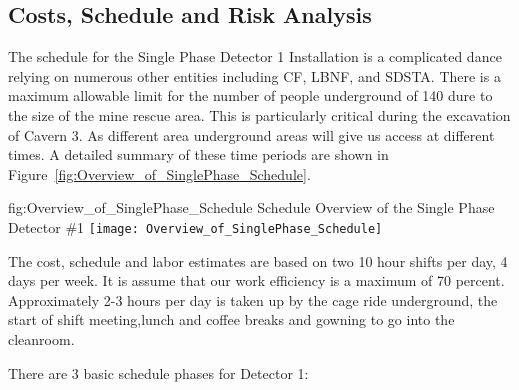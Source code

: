 \subsection{Costs, Schedule and Risk Analysis}
\label{sec:fdsp-tc-inst-cost}



The schedule for the Single Phase Detector 1 Installation is a complicated dance relying on numerous other entities including CF, LBNF, and SDSTA.  There is a maximum allowable limit for the number of people underground of 140 dure to the size of the mine rescue area.  This is particularly critical during the excavation of Cavern 3. As different area underground areas will give us access at different times. A detailed summary of these time periods are shown in Figure~\ref{fig:Overview_of_SinglePhase_Schedule}. 



\begin{dunefigure}
{fig:Overview_of_SinglePhase_Schedule}
{Schedule Overview of the Single Phase Detector \#1}                
\texttt{[image: Overview\_of\_SinglePhase\_Schedule]}
\end{dunefigure}

The cost, schedule and labor estimates are based on two 10 hour shifts per day, 4 days per week. It is assume that our work efficiency is a maximum of 70 percent.  Approximately 2-3 hours per day is taken up by the cage ride underground, the start of shift meeting,lunch and coffee breaks and gowning to go into the cleanroom. 

There are 3 basic schedule phases for Detector 1:

